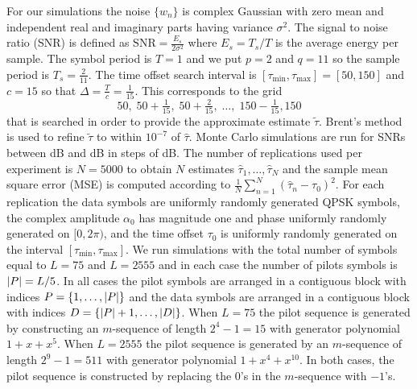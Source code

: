 \documentclass[journal]{IEEEtranTCOM}
\begin{document}
For our simulations the noise $\{w_n\}$ is complex Gaussian with zero mean and independent real and imaginary parts having variance $\sigma^2$.  The signal to noise ratio (SNR) is defined as $\text{SNR} = \frac{E_s}{2\sigma^2}$ where $E_s = T_s/T$ is the average energy per sample.  The symbol period is $T=1$ and we put $p = 2$ and $q=11$ so the sample period is $T_s = \tfrac{2}{11}$.  The time offset search interval is $[\tau_{\text{min}}, \tau_{\text{max}}] = [50,150]$ and $c = 15$ so that $\Delta = \tfrac{T}{c} = \tfrac{1}{15}$.  This corresponds to the grid
\[
50, \; 50 + \tfrac{1}{15}, \; 50 + \tfrac{2}{15}, \; \dots, \; 150 - \tfrac{1}{15}, 150
\]
that is searched in order to provide the approximate estimate $\tilde{\tau}$.  Brent's method is used to refine $\tilde{\tau}$ to within $10^{-7}$ of $\hat{\tau}$.  Monte Carlo simulations are run for SNRs between \unit[-20]{dB} and \unit[20]{dB} in steps of \unit[2]{dB}. The number of replications used per experiment is $N=5000$ to obtain $N$ estimates $\hat{\tau}_1, \dots, \hat{\tau}_N$ and the sample mean square error (MSE) is computed according to $\tfrac{1}{N}\sum_{n=1}^N(\hat{\tau}_n - \tau_0)^2$.  For each replication the data symbols are uniformly randomly generated QPSK symbols, the complex amplitude $\alpha_0$ has magnitude one and phase uniformly randomly generated on $[0, 2\pi)$, and the time offset $\tau_0$ is uniformly randomly generated on the interval $[\tau_{\text{min}}, \tau_{\text{max}}]$.  We run simulations with the total number of symbols equal to $L=75$ and $L=2555$ and in each case the number of pilots symbols is ${\left\vert P \right\vert} = L/5$.  In all cases the pilot symbols are arranged in a contiguous block with indices $P = \{1,\dots,{\left\vert P \right\vert}\}$ and the data symbols are arranged in a contiguous block with indices $D = \{{\left\vert P \right\vert}+1, \dots,{\left\vert D \right\vert}\}$.  When $L=75$ the pilot sequence is generated by constructing an $m$-sequence of length $2^4-1 = 15$ with generator polynomial $1 + x + x^5$.  When $L=2555$ the pilot sequence is generated by an $m$-sequence of length $2^{9}-1 = 511$ with generator polynomial $1 + x^4 + x^{10}$.  In both cases, the pilot sequence is constructed by replacing the $0$'s in the $m$-sequence with $-1$'s.
\end{document}
